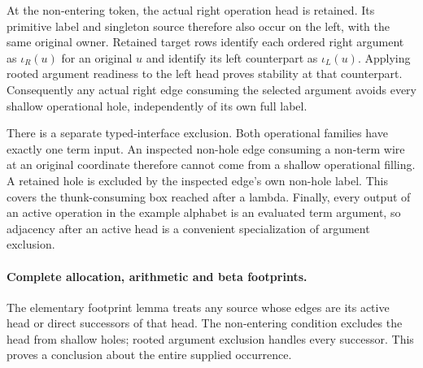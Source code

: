 At the non-entering token, the actual right operation head is retained. Its primitive
label and singleton source therefore also occur on the left, with the same
original owner. Retained target rows identify each ordered right argument as
$\iota_R(u)$ for an original $u$ and identify its left counterpart as
$\iota_L(u)$. Applying rooted argument readiness to the left head proves
stability at that counterpart. Consequently any actual right edge consuming
the selected argument avoids every shallow operational hole, independently
of its own full label.

There is a separate typed-interface exclusion. Both operational families have
exactly one term input. An inspected non-hole edge consuming a non-term wire
at an original coordinate therefore cannot come from a shallow operational
filling. A retained hole is excluded by the inspected edge's own non-hole
label. This covers the thunk-consuming box reached after a lambda. Finally,
every output of an active operation in the example alphabet is an evaluated
term argument, so adjacency after an active head is a convenient specialization
of argument exclusion.

\paragraph{Complete allocation, arithmetic and beta footprints.}
The elementary footprint lemma treats any source whose edges are its active
head or direct successors of that head. The non-entering condition excludes
the head from shallow holes; rooted argument exclusion handles every successor.
This proves a conclusion about the entire supplied occurrence.

